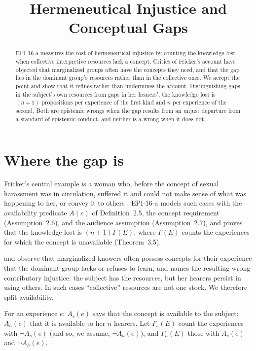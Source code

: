 \documentclass{situationist-preprint}
\title{Hermeneutical Injustice and Conceptual Gaps}
\begin{document}
\maketitle

\begin{abstract}
EPI-16-a measures the cost of hermeneutical injustice by counting the knowledge lost when collective interpretive resources lack a concept. Critics of Fricker's account have objected that marginalized groups often have the concepts they need, and that the gap lies in the dominant group's resources rather than in the collective ones. We accept the point and show that it refines rather than undermines the account. Distinguishing gaps in the subject's own resources from gaps in her hearers', the knowledge lost is $(n+1)$ propositions per experience of the first kind and $n$ per experience of the second. Both are epistemic wrongs when the gap results from an unjust departure from a standard of epistemic conduct, and neither is a wrong when it does not.
\end{abstract}

\section{Where the gap is}

Fricker's central example is a woman who, before the concept of sexual harassment was in circulation, suffered it and could not make sense of what was happening to her, or convey it to others \citep[ch.~7]{Fricker2007}. EPI-16-a models such cases with the availability predicate $A(e)$ of Definition~2.5, the concept requirement (Assumption~2.6), and the audience assumption (Assumption~2.7), and proves that the knowledge lost is $(n+1)\Gamma(E)$, where $\Gamma(E)$ counts the experiences for which the concept is unavailable (Theorem~3.5).

\citet{Mason2011} and \citet{Pohlhaus2012} observe that marginalized knowers often possess concepts for their experience that the dominant group lacks or refuses to learn, and \citet{Dotson2012} names the resulting wrong contributory injustice: the subject has the resources, but her hearers persist in using others. In such cases \enquote{collective} resources are not one stock. We therefore split availability.

\begin{definition}\label{d:two}
For an experience $e$: $A_s(e)$ says that the concept is available to the subject; $A_h(e)$ that it is available to her $n$ hearers. Let $\Gamma_s(E)$ count the experiences with $\neg A_s(e)$ (and so, we assume, $\neg A_h(e)$), and $\Gamma_h(E)$ those with $A_s(e)$ and $\neg A_h(e)$.
\end{definition}
\end{document}
